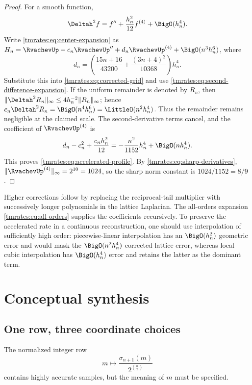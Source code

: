 \documentclass[11pt,oneside]{article}
\theoremstyle{definition}
\theoremstyle{remark}
\begin{document}
\begin{proof}
For a smooth function,
\begin{equation}
 \Deltah^2f=f''+\frac{h_n^2}{12}f^{(4)}+\BigO(h_n^4).      \label{tmrates:eq:second-difference-expansion}
\end{equation}
Write \eqref{tmrates:eq:center-expansion} as
$H_n=\RvachevUp-c_n\RvachevUp''+d_n\RvachevUp^{(4)}+\BigO(n^3h_n^6)$, where
\[
 d_n=\left(\frac{15n+16}{43200}
          +\frac{(3n+4)^2}{10368}\right)h_n^4.
\]
Substitute this into \eqref{tmrates:eq:corrected-grid} and use
\eqref{tmrates:eq:second-difference-expansion}.  If the uniform remainder is denoted by $R_n$, then
$\|\Deltah^2R_n\|_\infty\le4h_n^{-2}\|R_n\|_\infty$; hence
$c_n\Deltah^2R_n=\BigO(n^4h_n^6)=\LittleO(n^2h_n^4)$.  Thus the remainder remains negligible
at the claimed scale.  The second-derivative terms cancel, and the coefficient of
$\RvachevUp^{(4)}$ is
\begin{equation*}
 d_n-c_n^2+\frac{c_nh_n^2}{12}
 =-\frac{n^2}{1152}h_n^4+\BigO(nh_n^4).
\end{equation*}
This proves \eqref{tmrates:eq:accelerated-profile}.  By \eqref{tmrates:eq:sharp-derivatives},
$\|\RvachevUp^{(4)}\|_\infty=2^{10}=1024$, so the sharp norm constant is
$1024/1152=8/9$.
\end{proof}

Higher corrections follow by replacing the reciprocal-tail multiplier with successively
longer polynomials in the lattice Laplacian.  The all-orders expansion
\eqref{tmrates:eq:all-orders} supplies the coefficients recursively.  To preserve the accelerated
rate in a continuous reconstruction, one should use interpolation of sufficiently high order:
piecewise-linear interpolation has an $\BigO(h_n^2)$ geometric error and would mask the
$\BigO(n^2h_n^4)$ corrected lattice error, whereas local cubic interpolation has
$\BigO(h_n^4)$ error and retains the latter as the dominant term.

\section{Conceptual synthesis}
\label{tmrates:sec:synthesis}

\subsection{One row, three coordinate choices}

The normalized integer row
\begin{equation}
 m\longmapsto\frac{\sigma_{n+1}(m)}{2^{\binom n2}}        \label{tmrates:eq:one-row}
\end{equation}
contains highly accurate samples, but the meaning of $m$ must be specified.
\end{document}
